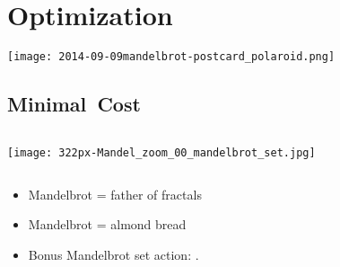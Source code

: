 
\section{Optimization}


\begin{frame}
  \texttt{[image: 2014-09-09mandelbrot-postcard\_polaroid.png]}
\end{frame}

\subsection{Minimal\ Cost}

\begin{frame}

  \begin{block}{}
    \bigskip
  
    \begin{columns}
      \texttt{[image: 322px-Mandel\_zoom\_00\_mandelbrot\_set.jpg]}
    \end{columns}

    \bigskip
    \bigskip
    \begin{itemize}
    \item
      Mandelbrot = father of fractals
    \item
      Mandelbrot = almond bread
    \item 
      Bonus Mandelbrot set action: .
    \end{itemize}
  \end{block}

\end{frame}
  

